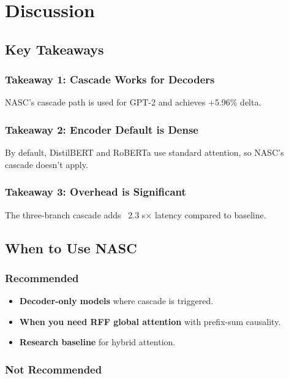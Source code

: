
\section{Discussion}

\subsection{Key Takeaways}

\subsubsection{Takeaway 1: Cascade Works for Decoders}

NASC's cascade path is used for GPT-2 and achieves +5.96\% delta.

\subsubsection{Takeaway 2: Encoder Default is Dense}

By default, DistilBERT and RoBERTa use standard attention, so NASC's 
cascade doesn't apply.

\subsubsection{Takeaway 3: Overhead is Significant}

The three-branch cascade adds ~2.3 s$\times$ latency compared to baseline.

\subsection{When to Use NASC}

\subsubsection{Recommended}

\begin{itemize}
\item \textbf{Decoder-only models} where cascade is triggered.
\item \textbf{When you need RFF global attention} with prefix-sum causality.
\item \textbf{Research baseline} for hybrid attention.

\end{itemize}
\subsubsection{Not Recommended}

